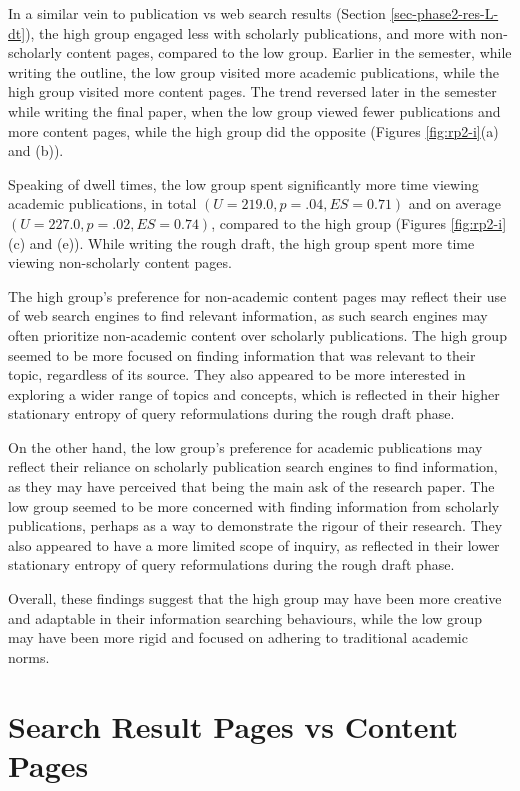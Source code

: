 \documentclass[letterpaper, nobind]{templates/ociamthesis}
\begin{document}
In a similar vein to publication vs web search results (Section \ref{sec-phase2-res-L-dt}), the high group engaged less with scholarly publications, and more with non-scholarly content pages, compared to the low group.
Earlier in the semester, while writing the outline, the low group visited more academic publications, while the high group visited more content pages.
The trend reversed later in the semester while writing the final paper, when the low group viewed fewer publications and more content pages, while the high group did the opposite (Figures \ref{fig:rp2-i}(a) and (b)).

Speaking of dwell times, the low group spent significantly more time viewing academic publications, in total \((U = 219.0, p = .04, ES = 0.71)\) and on average \((U = 227.0, p = .02, ES = 0.74)\), compared to the high group (Figures \ref{fig:rp2-i}(c) and (e)).
While writing the rough draft, the high group spent more time viewing non-scholarly content pages.

The high group's preference for non-academic content pages may reflect their use of web search engines to find relevant information, as such search engines may often prioritize non-academic content over scholarly publications.
The high group seemed to be more focused on finding information that was relevant to their topic, regardless of its source. They also appeared to be more interested in exploring a wider range of topics and concepts, which is reflected in their higher stationary entropy of query reformulations during the rough draft phase.

On the other hand, the low group's preference for academic publications may reflect their reliance on scholarly publication search engines to find information, as they may have perceived that being the main ask of the research paper.
The low group seemed to be more concerned with finding information from scholarly publications, perhaps as a way to demonstrate the rigour of their research.
They also appeared to have a more limited scope of inquiry, as reflected in their lower stationary entropy of query reformulations during the rough draft phase.

Overall, these findings suggest that the high group may have been more creative and adaptable in their information searching behaviours, while the low group may have been more rigid and focused on adhering to traditional academic norms.

\hypertarget{search-result-pages-vs-content-pages}{%
\section{Search Result Pages vs Content Pages}\label{search-result-pages-vs-content-pages}}
\end{document}
